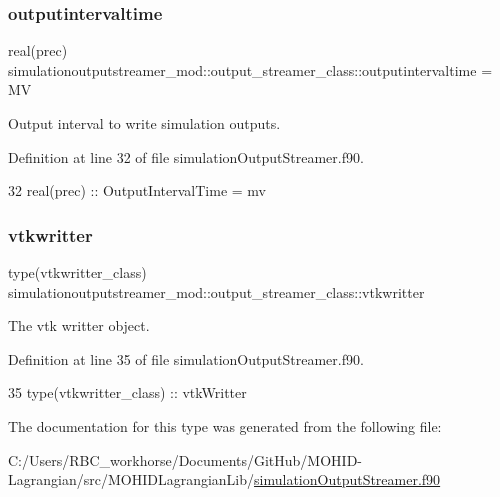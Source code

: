 \subsubsection{\texorpdfstring{outputintervaltime}{outputintervaltime}}
{\footnotesize\ttfamily real(prec) simulationoutputstreamer\+\_\+mod\+::output\+\_\+streamer\+\_\+class\+::outputintervaltime = MV\hspace{0.3cm}{\ttfamily [private]}}



Output interval to write simulation outputs. 



Definition at line 32 of file simulation\+Output\+Streamer.\+f90.


\begin{DoxyCode}
32         \textcolor{keywordtype}{real(prec)} :: OutputIntervalTime = mv      
\end{DoxyCode}
\mbox{\label{structsimulationoutputstreamer__mod_1_1output__streamer__class_a883916a5ede4ceff754115bd3317649e}} 
\subsubsection{\texorpdfstring{vtkwritter}{vtkwritter}}
{\footnotesize\ttfamily type(vtkwritter\+\_\+class) simulationoutputstreamer\+\_\+mod\+::output\+\_\+streamer\+\_\+class\+::vtkwritter\hspace{0.3cm}{\ttfamily [private]}}



The vtk writter object. 



Definition at line 35 of file simulation\+Output\+Streamer.\+f90.


\begin{DoxyCode}
35         \textcolor{keywordtype}{type}(vtkwritter\_class) :: vtkWritter
\end{DoxyCode}


The documentation for this type was generated from the following file\+:\begin{DoxyCompactItemize}
\item 
C\+:/\+Users/\+R\+B\+C\+\_\+workhorse/\+Documents/\+Git\+Hub/\+M\+O\+H\+I\+D-\/\+Lagrangian/src/\+M\+O\+H\+I\+D\+Lagrangian\+Lib/\mbox{\hyperlink{simulation_output_streamer_8f90}{simulation\+Output\+Streamer.\+f90}}\end{DoxyCompactItemize}
